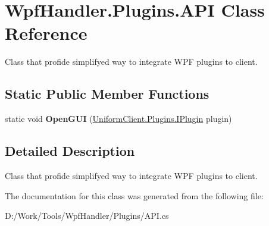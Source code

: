\hypertarget{class_wpf_handler_1_1_plugins_1_1_a_p_i}{}\section{Wpf\+Handler.\+Plugins.\+A\+PI Class Reference}
\label{class_wpf_handler_1_1_plugins_1_1_a_p_i}


Class that profide simplifyed way to integrate W\+PF plugins to client.  


\subsection*{Static Public Member Functions}
\begin{DoxyCompactItemize}
\item 
\mbox{\label{class_wpf_handler_1_1_plugins_1_1_a_p_i_ab5fa2212cf7d00290d86c0aa5bc65f91}} 
static void {\bfseries Open\+G\+UI} (\mbox{\hyperlink{interface_uniform_client_1_1_plugins_1_1_i_plugin}{Uniform\+Client.\+Plugins.\+I\+Plugin}} plugin)
\end{DoxyCompactItemize}


\subsection{Detailed Description}
Class that profide simplifyed way to integrate W\+PF plugins to client. 



The documentation for this class was generated from the following file\+:\begin{DoxyCompactItemize}
\item 
D\+:/\+Work/\+Tools/\+Wpf\+Handler/\+Plugins/A\+P\+I.\+cs\end{DoxyCompactItemize}
